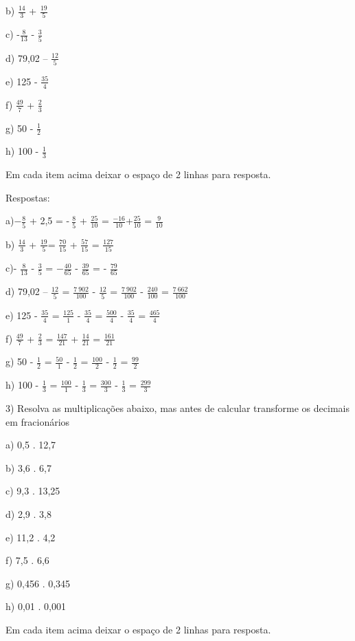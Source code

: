 {b) \(\frac{14}{3}\) + \(\frac{19}{5}\)

c) -\(\frac{8}{13}\) - \(\frac{3}{5}\)

d) 79,02 -- \(\frac{12}{5}\)

e) 125 - \(\frac{35}{4}\)

f) \(\frac{49}{7}\) + \(\frac{2}{3}\)

g) 50 - \(\frac{1}{2}\)

h) 100 - \(\frac{1}{3}\)

Em cada item acima deixar o espaço de 2 linhas para resposta.

Respostas:

a)\(- \frac{8}{5}\) + 2,5 = -\(\ \frac{8}{5}\) + \(\frac{25}{10}\) =
\(\frac{- 16}{10}\)+\(\frac{25}{10}\) = \(\frac{9}{10}\)

b) \(\frac{14}{3}\) + \(\frac{19}{5}\)= \(\frac{70}{15}\) +
\(\frac{57}{15}\) = \(\frac{127}{15}\)

c)- \(\frac{8}{13}\) - \(\frac{3}{5}\) = \(- \frac{40}{65}\) -
\(\frac{39}{65}\) = - \(\frac{79}{65}\)

d) 79,02 -- \(\frac{12}{5}\) = \(\frac{7\ 902}{100}\) - \(\frac{12}{5}\)
= \(\frac{7\ 902}{100}\) - \(\frac{240}{100}\) = \(\frac{7\ 662}{100}\)

e) 125 - \(\frac{35}{4}\) = \(\frac{125}{1}\) - \(\frac{35}{4}\) =
\(\frac{500}{4}\) - \(\frac{35}{4}\) = \(\frac{465}{4}\)

f) \(\frac{49}{7}\) + \(\frac{2}{3}\) = \(\frac{147}{21}\) +
\(\frac{14}{21}\) = \(\frac{161}{21}\)

g) 50 - \(\frac{1}{2}\) = \(\frac{50}{1}\) - \(\frac{1}{2}\) =
\(\frac{100}{2}\) - \(\frac{1}{2}\) = \(\frac{99}{2}\)

h) 100 - \(\frac{1}{3}\) = \(\frac{100}{1}\) - \(\frac{1}{3}\) =
\(\frac{300}{3}\) - \(\frac{1}{3}\) = \(\frac{299}{3}\)

3) Resolva as multiplicações abaixo, mas antes de calcular transforme os
decimais em fracionários

a) 0,5 . 12,7

b) 3,6 . 6,7

c) 9,3 . 13,25

d) 2,9 . 3,8

e) 11,2 . 4,2

f) 7,5 . 6,6

g) 0,456 . 0,345

h) 0,01 . 0,001

Em cada item acima deixar o espaço de 2 linhas para resposta.

}
